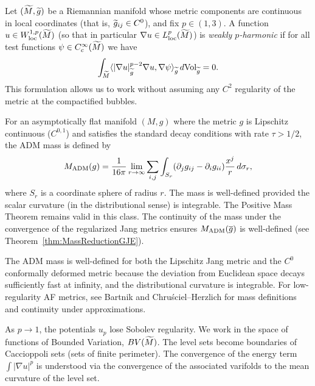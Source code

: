\begin{definition}
Let $(\widetilde{M}, \widetilde{g})$ be a Riemannian manifold whose metric components are continuous in local coordinates (that is, $\widetilde{g}_{ij} \in C^0$), and fix $p\in(1,3)$. A function $u \in W^{1,p}_{\text{loc}}(\widetilde{M})$ (so that in particular $\nabla u \in L^p_{\mathrm{loc}}(\widetilde{M})$) is \emph{weakly $p$-harmonic} if for all test functions $\psi \in C^\infty_c(\widetilde{M})$ we have
\begin{equation}
    \int_{\widetilde{M}} \langle |\nabla u|_{\widetilde{g}}^{p-2} \nabla u, \nabla \psi \rangle_{\widetilde{g}} \,d\text{Vol}_{\widetilde{g}} = 0.
\end{equation}
This formulation allows us to work without assuming any $C^2$ regularity of the metric at the compactified bubbles.
\end{definition}

\begin{definition}\label{def:ADM_Lipschitz}
For an asymptotically flat manifold $(M,g)$ where the metric $g$ is Lipschitz continuous ($C^{0,1}$) and satisfies the standard decay conditions with rate $\tau > 1/2$, the ADM mass is defined by
\begin{equation}
    M_{\mathrm{ADM}}(g) = \frac{1}{16\pi} \lim_{r \to \infty} \sum_{i,j} \int_{S_r} (\partial_j g_{ij} - \partial_i g_{ii}) \frac{x^j}{r} \, d\sigma_r,
\end{equation}
where $S_r$ is a coordinate sphere of radius $r$. The mass is well-defined provided the scalar curvature (in the distributional sense) is integrable. The Positive Mass Theorem remains valid in this class. The continuity of the mass under the convergence of the regularized Jang metrics ensures $M_{\mathrm{ADM}}(\overline{g})$ is well-defined (see Theorem~\ref{thm:MassReductionGJE}).

The ADM mass is well-defined for both the Lipschitz Jang metric and the $C^0$ conformally deformed metric because the deviation from Euclidean space decays sufficiently fast at infinity, and the distributional curvature is integrable. For low-regularity AF metrics, see Bartnik \cite{bartnik1986} and Chru\'sciel--Herzlich \cite{chruscielherrzlich2003} for mass definitions and continuity under approximations.
\end{definition}


\begin{definition}
As $p \to 1$, the potentials $u_p$ lose Sobolev regularity. We work in the space of functions of Bounded Variation, $BV(\widetilde{M})$. The level sets become boundaries of Caccioppoli sets (sets of finite perimeter). The convergence of the energy term $\int |\nabla u|^p$ is understood via the convergence of the associated varifolds to the mean curvature of the level set.
\end{definition}

